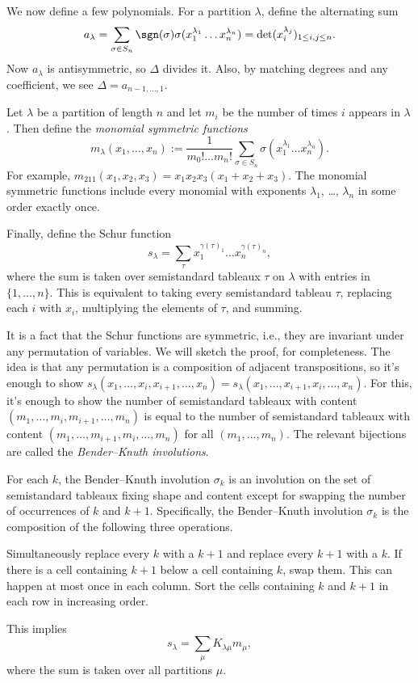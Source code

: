 \documentclass[11pt]{scrartcl}
\begin{document}
We now define a few polynomials. For a partition $\lambda$, define the alternating sum
\[a_\lambda = \sum_{\sigma \in S_n}\sgn(\sigma)\sigma(x_1^{\lambda_1}\dots x_n^{\lambda_n}) = \det(x_i^{\lambda_j})_{1 \le i,j \le n}.\]
Now $a_\lambda$ is antisymmetric, so $\Delta$ divides it. Also, by matching degrees and any coefficient, we see $\Delta = a_{n - 1,\dots,1}$.

Let $\lambda$ be a partition of length $n$ and let $m_i$ be the number of times $i$ appears in $\lambda$. Then define the \emph{monomial symmetric functions}
\[m_\lambda(x_1,\dots,x_n) := \frac1{m_0!\dots m_n!}\sum_{\sigma \in S_n}\sigma(x_1^{\lambda_1} \dots x_n^{\lambda_n}).\]
For example, $m_{211}(x_1,x_2,x_3) = x_1x_2x_3(x_1 + x_2 + x_3)$. The monomial symmetric functions include every monomial with exponents $\lambda_1$, \dots, $\lambda_n$ in some order exactly once.

Finally, define the Schur function
\[s_\lambda = \sum_\tau x_1^{\gamma(\tau)_1}\dots x_n^{\gamma(\tau)_n},\]
where the sum is taken over semistandard tableaux $\tau$ on $\lambda$ with entries in $\{1,\dots,n\}$. This is equivalent to taking every semistandard tableau $\tau$, replacing each $i$ with $x_i$, multiplying the elements of $\tau$, and summing.

It is a fact that the Schur functions are symmetric, i.e., they are invariant under any permutation of variables. We will sketch the proof, for completeness. The idea is that any permutation is a composition of adjacent transpositions, so it's enough to show $s_\lambda(x_1,\dots,x_i,x_{i + 1},\dots,x_n) = s_\lambda(x_1,\dots,x_{i + 1},x_i,\dots,x_n)$. For this, it's enough to show the number of semistandard tableaux with content $(m_1,\dots,m_i,m_{i + 1},\dots,m_n)$ is equal to the number of semistandard tableaux with content $(m_1,\dots,m_{i + 1},m_i,\dots,m_n)$ for all $(m_1,\dots,m_n)$. The relevant bijections are called the \emph{Bender--Knuth involutions}.

\begin{definition}
	For each $k$, the Bender--Knuth involution $\sigma_k$ is an involution on the set of semistandard tableaux fixing shape and content except for swapping the number of occurrences of $k$ and $k + 1$. Specifically, the Bender--Knuth involution $\sigma_k$ is the composition of the following three operations.
	\begin{enumerate}
		\ii Simultaneously replace every $k$ with a $k + 1$ and replace every $k + 1$ with a $k$.
		\ii If there is a cell containing $k + 1$ below a cell containing $k$, swap them. This can happen at most once in each column.
		\ii Sort the cells containing $k$ and $k + 1$ in each row in increasing order.
	\end{enumerate}
\end{definition}
This implies
\[s_\lambda = \sum_\mu K_{\lambda\mu}m_\mu,\]
where the sum is taken over all partitions $\mu$.
\end{document}
